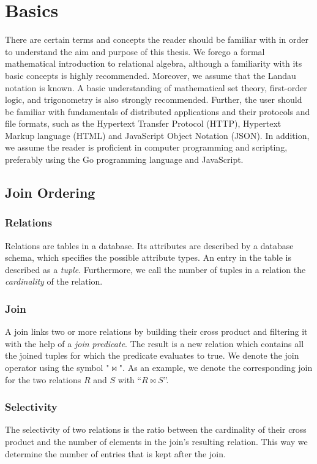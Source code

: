 \section{Basics}
\label{sec:basics}

There are certain terms and concepts the reader should be familiar with in order to understand the aim and purpose of this thesis. 
We forego a formal mathematical introduction to relational algebra, although a familiarity with its basic concepts is highly recommended. 
Moreover, we assume that the Landau notation is known. A basic understanding of mathematical set theory, first-order logic, and trigonometry is also strongly recommended. Further, the user should be familiar with fundamentals of distributed applications and their protocols and file formats, such as the Hypertext Transfer Protocol (HTTP), Hypertext Markup language (HTML) and JavaScript Object Notation (JSON). In addition, we assume the reader is proficient in computer programming and scripting, preferably using the Go programming language and JavaScript.

\subsection{Join Ordering}
\subsubsection{Relations}
Relations are tables in a database. 
Its attributes are described by a database schema, which specifies the possible attribute types.
An entry in the table is described as a \textit{tuple}. Furthermore, we call the number of tuples in a relation the \textit{cardinality} of the relation.

\subsubsection{Join}
A join links two or more relations by building their cross product and filtering it with the help of a \textit{join predicate}. 
The result is a new relation which contains all the joined tuples for which the predicate evaluates to true. We denote the join operator using the symbol "$\Join$". 
As an example, we denote the corresponding join for the two relations $R$ and $S$ with ``$R \Join S$''.

\subsubsection{Selectivity}
The selectivity of two relations is the ratio between the cardinality of their cross product and the number of elements in the join's resulting relation. 
This way we determine the number of entries that is kept after the join.

